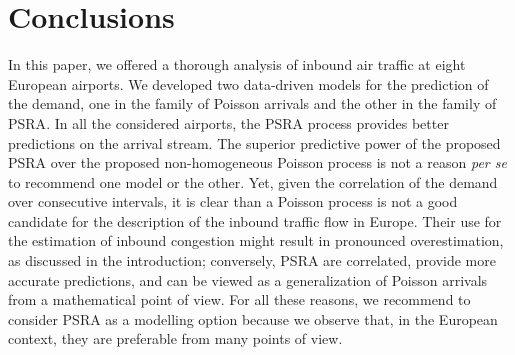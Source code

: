 \documentclass[draft,review]{elsarticle}
\begin{document}
\section{Conclusions}\label{sec:conclusions}






  In this paper, we offered a thorough analysis of inbound air traffic at eight European airports. We developed two data-driven models for the prediction of the demand, one in the family of Poisson arrivals and the other in the family of \ac{PSRA}.
  In all the considered airports, the \ac{PSRA} process provides better predictions on the arrival stream.
  The superior predictive power of the proposed \ac{PSRA} over the proposed non-homogeneous Poisson process is not a reason \emph{per se} to recommend one model or the other.
  Yet, given the correlation of the demand over consecutive intervals, it is clear than a Poisson process is not a good candidate for the description of the inbound traffic flow in Europe. Their use for the estimation of inbound congestion might result in pronounced overestimation, as discussed in the introduction; conversely, \ac{PSRA} are correlated, provide more accurate predictions, and can be viewed as a generalization of Poisson arrivals from a mathematical point of view. For all these reasons, we recommend to consider \ac{PSRA} as a modelling option because we observe that, in the European context, they are preferable from many points of view.
\end{document}
